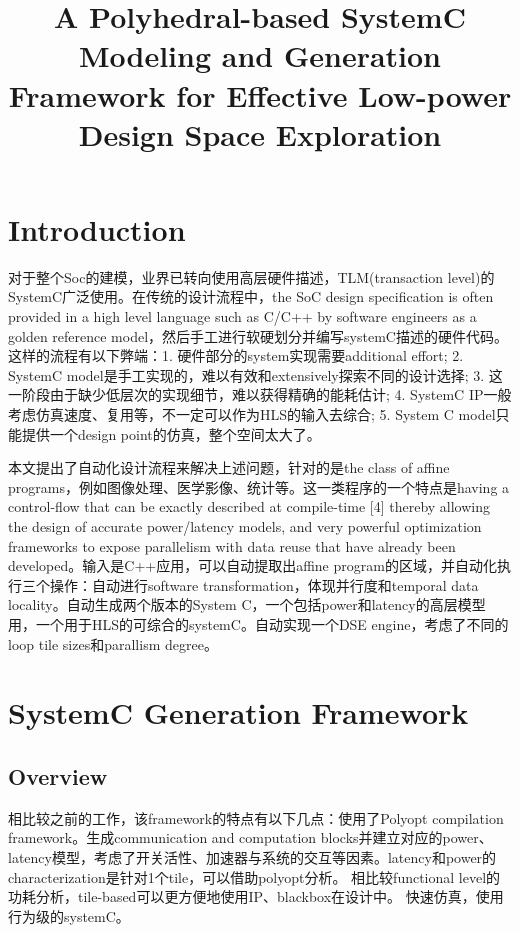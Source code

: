 \documentclass[UTF8]{scrartcl}
\title{A Polyhedral-based SystemC Modeling and Generation Framework for Effective Low-power Design Space Exploration}
\author{}
\begin{document}
\maketitle

\begin{abstract}

\end{abstract}

\section{Introduction}
	
	对于整个Soc的建模，业界已转向使用高层硬件描述，TLM(transaction level)的SystemC广泛使用。在传统的设计流程中，the SoC design specification is often provided in a high level language such as C/C++ by software engineers as a golden reference model，然后手工进行软硬划分并编写systemC描述的硬件代码。这样的流程有以下弊端：1. 硬件部分的system实现需要additional effort; 2. SystemC model是手工实现的，难以有效和extensively探索不同的设计选择; 3. 这一阶段由于缺少低层次的实现细节，难以获得精确的能耗估计; 4. SystemC IP一般考虑仿真速度、复用等，不一定可以作为HLS的输入去综合; 5. System C model只能提供一个design point的仿真，整个空间太大了。
	
	本文提出了自动化设计流程来解决上述问题，针对的是the class of affine programs，例如图像处理、医学影像、统计等。这一类程序的一个特点是having a control-flow that can be exactly described at compile-time [4] thereby allowing the design of accurate power/latency models, and very powerful optimization frameworks to expose parallelism with data reuse that have already been developed。输入是C++应用，可以自动提取出affine program的区域，并自动化执行三个操作：自动进行software transformation，体现并行度和temporal data locality。自动生成两个版本的System C，一个包括power和latency的高层模型用，一个用于HLS的可综合的systemC。自动实现一个DSE engine，考虑了不同的loop tile sizes和parallism degree。


\section{SystemC Generation Framework}

	\subsection{Overview}

		相比较之前的工作，该framework的特点有以下几点：使用了Polyopt compilation framework。生成communication and computation blocks并建立对应的power、latency模型，考虑了开关活性、加速器与系统的交互等因素。latency和power的characterization是针对1个tile，可以借助polyopt分析。	相比较functional level的功耗分析，tile-based可以更方便地使用IP、blackbox在设计中。	快速仿真，使用行为级的systemC。
		
\end{document}
